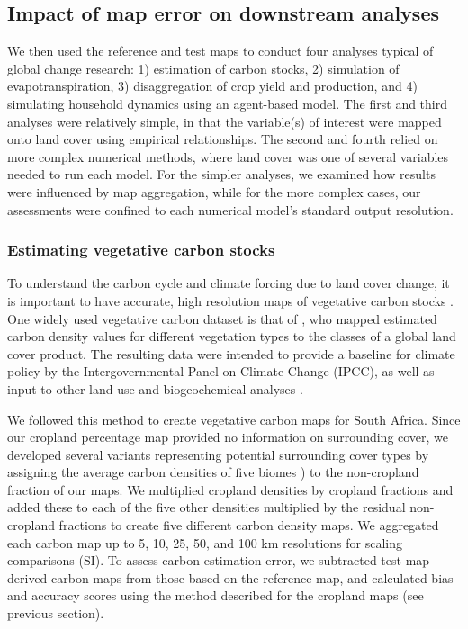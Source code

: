 \documentclass[12 pt, titlepage, a4paper]{article}
\begin{document}
\vspace{-0.3 cm}
\subsection*{Impact of map error on downstream analyses}
\vspace{-0.2 cm}
We then used the reference and test maps to conduct four analyses typical of global change research: 1) estimation of carbon stocks, 2) simulation of evapotranspiration, 3) disaggregation of crop yield and production, and 4) simulating household dynamics using an agent-based model. The first and third analyses were relatively simple, in that the variable(s) of interest were mapped onto land cover using empirical relationships. The second and fourth relied on more complex numerical methods, where land cover was one of several variables needed to run each model. For the simpler analyses, we examined how results were influenced by map aggregation, while for the more complex cases, our assessments were confined to each numerical model's standard output resolution. 

\vspace{-0.3 cm}
\subsubsection*{Estimating vegetative carbon stocks}
\vspace{-0.2 cm}
To understand the carbon cycle and climate forcing due to land cover change, it is important to have accurate, high resolution maps of vegetative carbon stocks \citep[][]{searchinger_high_2015}. One widely used vegetative carbon dataset is that of \citep{ruesch_new_2008}, who mapped estimated carbon density values for different vegetation types to the classes of a global land cover product. The resulting data were intended to provide a baseline for climate policy by the Intergovernmental Panel on Climate Change (IPCC), as well as input to other land use and biogeochemical analyses \citep{ruesch_new_2008}. 

We followed this method to create vegetative carbon maps for South Africa. Since our cropland percentage map provided no information on surrounding cover, we developed several variants representing potential surrounding cover types by assigning the average carbon densities of five biomes \citep[forest, secondary forest, shrubland, grassland, and sparse vegetation;][]{ruesch_new_2008}) to the non-cropland fraction of our maps. We multiplied cropland densities by cropland fractions and added these to each of the five other densities multiplied by the residual non-cropland fractions to create five different carbon density maps. We aggregated each carbon map up to 5, 10, 25, 50, and 100 km resolutions for scaling comparisons (SI). To assess carbon estimation error, we subtracted test map-derived carbon maps from those based on the reference map, and calculated bias and accuracy scores using the method described for the cropland maps (see previous section). 
\end{document}
